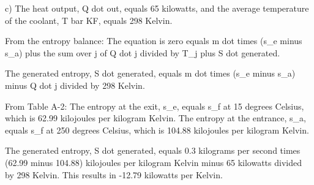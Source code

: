 c) The heat output, Q dot out, equals 65 kilowatts, and the average temperature of the coolant, T bar KF, equals 298 Kelvin.

From the entropy balance:
The equation is zero equals m dot times (s_e minus s_a) plus the sum over j of Q dot j divided by T_j plus S dot generated.

The generated entropy, S dot generated, equals m dot times (s_e minus s_a) minus Q dot j divided by 298 Kelvin.

From Table A-2:
The entropy at the exit, s_e, equals s_f at 15 degrees Celsius, which is 62.99 kilojoules per kilogram Kelvin.
The entropy at the entrance, s_a, equals s_f at 250 degrees Celsius, which is 104.88 kilojoules per kilogram Kelvin.

The generated entropy, S dot generated, equals 0.3 kilograms per second times (62.99 minus 104.88) kilojoules per kilogram Kelvin minus 65 kilowatts divided by 298 Kelvin.
This results in -12.79 kilowatts per Kelvin.